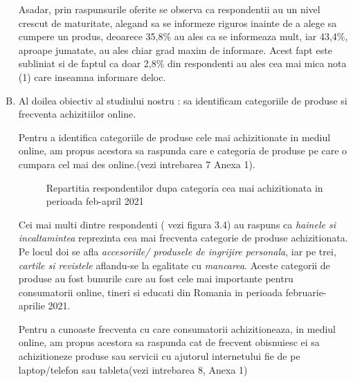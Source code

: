 \documentclass[a4paper, 12pt]{article}
\begin{document}
\begin{enumerate}[(A)]
	 	\qquad Asadar, prin raspunsurile oferite se observa ca respondentii au un nivel crescut de maturitate, alegand sa se informeze riguros inainte de a alege sa cumpere un produs, deoarece  35,8\% au ales ca se informeaza mult, iar 43,4\%, aproape jumatate, au ales chiar grad maxim de informare. Acest fapt este subliniat si de faptul ca doar 2,8\% din respondenti au ales cea mai mica nota (1) care inseamna informare deloc.

	 	
		\item Al doilea obiectiv al studiului nostru : sa identificam categoriile de produse si frecventa achizitiilor online.
		
		\quad Pentru a identifica categoriile de produse cele mai achizitionate in mediul online, am propus acestora sa raspunda care e categoria de produse pe care o cumpara cel mai des online.(vezi intrebarea 7 Anexa 1).
		\begin{figure}[!htb]
			\centering
			\caption{Repartitia respondentilor dupa categoria cea mai achizitionata in perioada feb-april 2021} 
		\end{figure}
	
		\quad Cei mai multi dintre respondenti ( vezi figura 3.4) au raspuns ca\textit{ hainele si incaltamintea} reprezinta cea mai frecventa categorie de produse achizitionata. Pe locul doi se afla \textit{accesoriile/ produsele de ingrijire personala}, iar pe trei,\textit{ cartile si revistele} aflandu-se la egalitate cu \textit{mancarea}. Aceste categorii de produse au fost bunurile care au fost cele mai importante pentru consumatorii online, tineri si educati din Romania in perioada februarie-aprilie 2021.
	
		\qquad Pentru a cunoaste frecventa  cu care consumatorii achizitioneaza, in mediul  online, am propus acestora sa raspunda cat de frecvent obisnuiesc ei sa achizitioneze produse sau servicii cu ajutorul internetului fie de pe laptop/telefon sau tableta(vezi intrebarea 8, Anexa 1)
		\begin{figure}[!htb]
			\centering
			\begin{tikzpicture}
				

\end{tikzpicture}
\end{figure}
\end{enumerate}
\end{document}
